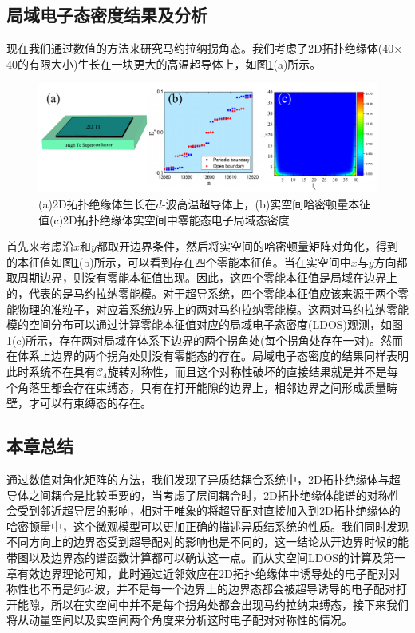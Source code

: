 \subsection{局域电子态密度结果及分析}
 现在我们通过数值的方法来研究马约拉纳拐角态。我们考虑了2D拓扑绝缘体(40$\times$40的有限大小)生长在一块更大的高温超导体上，如图\ref{fig18}(a)所示。
\begin{figure}[h]
\centering
\includegraphics[scale=0.45]{pic/fig19}
\caption{(a)2D拓扑绝缘体生长在$d$-波高温超导体上，(b)实空间哈密顿量本征值(c)2D拓扑绝缘体实空间中零能态电子局域态密度}\label{fig18}
\end{figure}
首先来考虑沿$x$和$y$都取开边界条件，然后将实空间的哈密顿量矩阵对角化，得到的本征值如图\ref{fig18}(b)所示，可以看到存在四个零能本征值。当在实空间中$x$与$y$方向都取周期边界，则没有零能本征值出现。因此，这四个零能本征值是局域在边界上的，代表的是马约拉纳零能模。对于超导系统，四个零能本征值应该来源于两个零能物理的准粒子，对应着系统边界上的两对马约拉纳零能模。这两对马约拉纳零能模的空间分布可以通过计算零能本征值对应的局域电子态密度(LDOS)观测，如图\ref{fig18}(c)所示，存在两对局域在体系下边界的两个拐角处(每个拐角处存在一对)。然而在体系上边界的两个拐角处则没有零能态的存在。局域电子态密度的结果同样表明此时系统不在具有$\mathcal{C}_4$旋转对称性，而且这个对称性破坏的直接结果就是并不是每个角落里都会存在束缚态，只有在打开能隙的边界上，相邻边界之间形成质量畴壁，才可以有束缚态的存在。
\subsection{本章总结}
 通过数值对角化矩阵的方法，我们发现了异质结耦合系统中，2D拓扑绝缘体与超导体之间耦合是比较重要的，当考虑了层间耦合时，2D拓扑绝缘体能谱的对称性会受到邻近超导层的影响，相对于唯象的将超导配对直接加入到2D拓扑绝缘体的哈密顿量中，这个微观模型可以更加正确的描述异质结系统的性质。我们同时发现不同方向上的边界态受到超导配对的影响也是不同的，这一结论从开边界时候的能带图以及边界态的谱函数计算都可以确认这一点。而从实空间LDOS的计算及第一章有效边界理论可知，此时通过近邻效应在2D拓扑绝缘体中诱导处的电子配对对称性也不再是纯$d$-波，并不是每一个边界上的边界态都会被超导诱导的电子配对打开能隙，所以在实空间中并不是每个拐角处都会出现马约拉纳束缚态，接下来我们将从动量空间以及实空间两个角度来分析这时电子配对对称性的情况。








